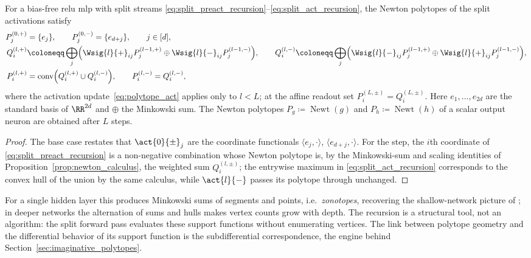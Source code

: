 \begin{corollary}\label{cor:minkowski_propagation}
For a bias-free \ac{relu} \ac{mlp} with split streams \eqref{eq:split_preact_recursion}--\eqref{eq:split_act_recursion}, the Newton polytopes of the split activations satisfy
\begin{align}
    P^{(0,+)}_j &= \{ e_j \},
    \qquad
    P^{(0,-)}_j = \{ e_{d+j} \},
    \qquad j \in [d], \notag \\
    Q^{(l,+)}_i &\coloneqq \bigoplus_j \Bigl( \Wsig{l}{+}_{ij} P^{(l-1,+)}_j \oplus \Wsig{l}{-}_{ij} P^{(l-1,-)}_j \Bigr),
    \qquad
    Q^{(l,-)}_i \coloneqq \bigoplus_j \Bigl( \Wsig{l}{-}_{ij} P^{(l-1,+)}_j \oplus \Wsig{l}{+}_{ij} P^{(l-1,-)}_j \Bigr),
    \label{eq:polytope_preact} \\
    P^{(l,+)}_i &= \operatorname{conv}\Bigl( Q^{(l,+)}_i \cup Q^{(l,-)}_i \Bigr),
    \qquad
    P^{(l,-)}_i = Q^{(l,-)}_i,
    \label{eq:polytope_act}
\end{align}
where the activation update~\eqref{eq:polytope_act} applies only to $l<L$; at the affine readout set $P^{(L,\pm)}_i=Q^{(L,\pm)}_i$. Here $e_1, \dots, e_{2d}$ are the standard basis of $\RR^{2d}$ and $\oplus$ the Minkowski sum. The Newton polytopes $P_g \coloneqq \operatorname{Newt}(g)$ and $P_h \coloneqq \operatorname{Newt}(h)$ of a scalar output neuron are obtained after $L$ steps.
\hfill{}
\end{corollary}

\begin{proof}
The base case restates that $\act{0}{\pm}_j$ are the coordinate functionals $\langle e_j, \cdot \rangle$, $\langle e_{d+j}, \cdot \rangle$. For the step, the $i$th coordinate of \eqref{eq:split_preact_recursion} is a non-negative combination whose Newton polytope is, by the Minkowski-sum and scaling identities of Proposition~\ref{prop:newton_calculus}, the weighted sum $Q^{(l,\pm)}_i$; the entrywise maximum in \eqref{eq:split_act_recursion} corresponds to the convex hull of the union by the same calculus, while $\act{l}{-}$ passes its polytope through unchanged.
\end{proof}

For a single hidden layer this produces Minkowski sums of segments and points, i.e.\ \emph{zonotopes}, recovering the shallow-network picture of \textcite{Zhang2018}; in deeper networks the alternation of sums and hulls makes vertex counts grow with depth. The recursion is a structural tool, not an algorithm: the split forward pass evaluates these support functions without enumerating vertices. The link between polytope geometry and the differential behavior of its support function is the subdifferential correspondence, the engine behind Section~\ref{sec:imaginative_polytopes}.

